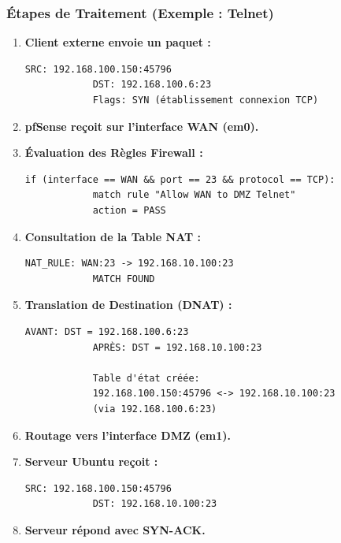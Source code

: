\documentclass[12pt,a4paper,openany]{report}
\begin{document}
	\subsubsection{Étapes de Traitement (Exemple : Telnet)}
	\begin{enumerate}
		\item \textbf{Client externe envoie un paquet :}
		\begin{lstlisting}[caption=Paquet initial]
			SRC: 192.168.100.150:45796
			DST: 192.168.100.6:23
			Flags: SYN (établissement connexion TCP)
		\end{lstlisting}
		
		\item \textbf{pfSense reçoit sur l'interface WAN (em0).}
		
		\item \textbf{Évaluation des Règles Firewall :}
		\begin{lstlisting}[caption=Pseudo-code de décision]
			if (interface == WAN && port == 23 && protocol == TCP):
			match rule "Allow WAN to DMZ Telnet"
			action = PASS
		\end{lstlisting}
		
		\item \textbf{Consultation de la Table NAT :}
		\begin{lstlisting}[caption=Recherche de correspondance NAT]
			NAT_RULE: WAN:23 -> 192.168.10.100:23
			MATCH FOUND
		\end{lstlisting}
		
		\item \textbf{Translation de Destination (DNAT) :}
		\begin{lstlisting}[caption=Réécriture du paquet]
			AVANT: DST = 192.168.100.6:23
			APRÈS: DST = 192.168.10.100:23
			
			Table d'état créée:
			192.168.100.150:45796 <-> 192.168.10.100:23
			(via 192.168.100.6:23)
		\end{lstlisting}
		
		\item \textbf{Routage vers l'interface DMZ (em1).}
		
		\item \textbf{Serveur Ubuntu reçoit :}
		\begin{lstlisting}[caption=Paquet arrivant au serveur]
			SRC: 192.168.100.150:45796
			DST: 192.168.10.100:23
		\end{lstlisting}
		
		\item \textbf{Serveur répond avec SYN-ACK.}
		

\end{enumerate}
\end{document}
